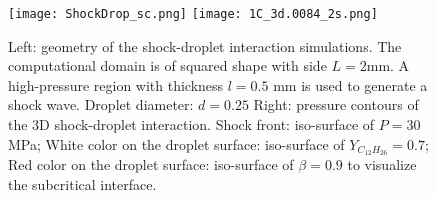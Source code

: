 \begin{figure}[htbp]
	\centering
	\texttt{[image: ShockDrop\_sc.png]}
	\hspace{.7in}
	\texttt{[image: 1C\_3d.0084\_2s.png]}
	\caption{Left: geometry of the shock-droplet interaction simulations. The computational domain is of squared shape with side $L=2$mm. A high-pressure region with thickness $l=0.5$ mm is used to generate a shock wave. Droplet diameter: $d=0.25$ Right: pressure contours of the 3D shock-droplet interaction. Shock front: iso-surface of $P=30$ MPa; White color on the droplet surface: iso-surface of $Y_{C_{12}H_{26}}=0.7$; Red color on the droplet surface: iso-surface of $\beta =0.9$ to visualize the subcritical interface.}
	\label{SD_GEO}
\end{figure}

